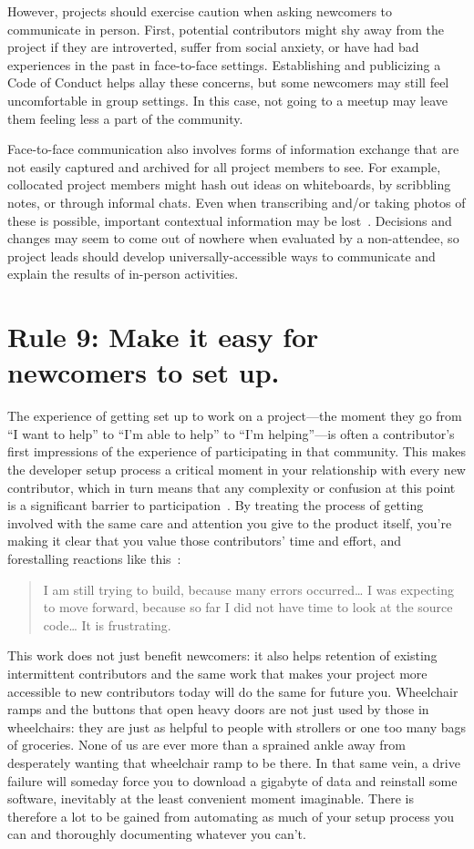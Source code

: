 \documentclass[10pt,letterpaper]{article}
\newcommand{\rulemajor}[1]{\section*{#1}}
\begin{document}
However,
projects should exercise caution when asking newcomers to communicate in person.
First, potential contributors might shy away from the project if they are introverted,
suffer from social anxiety,
or have had bad experiences in the past in face-to-face settings.
Establishing and publicizing a Code of Conduct helps allay these concerns,
but some newcomers may still feel uncomfortable in group settings.
In this case,
not going to a meetup may leave them feeling less a part of the community.

Face-to-face communication also involves forms of information exchange
that are not easily captured and archived for all project members to see.
For example,
collocated project members might hash out ideas on whiteboards,
by scribbling notes,
or through informal chats.
Even when transcribing and/or taking photos of these is possible,
important contextual information may be lost~\cite{cherubini2007}.
Decisions and changes may seem to come out of nowhere when evaluated by a non-attendee,
so project leads should develop universally-accessible ways to communicate and explain the results of in-person activities.

\rulemajor{Rule 9: Make it easy for newcomers to set up.}

The experience of getting set up to work on a project---the moment they go from ``I want to help''
to ``I'm able to help'' to ``I'm helping''---is often a contributor's first impressions of
the experience of participating in that community.
This makes the developer setup process a critical moment in your relationship with every new contributor,
which in turn means that any complexity or confusion at this point is a significant barrier to participation~\cite{steinmacher2014}.
By treating the process of getting involved with the same care and attention you give to the product itself,
you're making it clear that you value those contributors' time and effort,
and forestalling reactions like this~\cite{steinmacher2018b}:

\begin{quote}
  I am still trying to build, because many errors occurred{\ldots}
  I was expecting to move forward,
  because so far I did not have time to look at the source code{\ldots}
  It is frustrating.
\end{quote}

This work does not just benefit newcomers:
it also helps retention of existing intermittent contributors and the same work that makes your project more
accessible to new contributors today will do the same for future you.
Wheelchair ramps and the buttons that open heavy doors are not just used by those in wheelchairs:
they are just as helpful to people with strollers or one too many bags of groceries.
None of us are ever more than a sprained ankle away from desperately wanting that wheelchair ramp to be there.
In that same vein, a drive failure will someday force you to download a gigabyte of data
and reinstall some software, inevitably at the least convenient moment imaginable.
There is therefore a lot to be gained from automating as much of your setup process you can
and thoroughly documenting whatever you can't.
\end{document}
